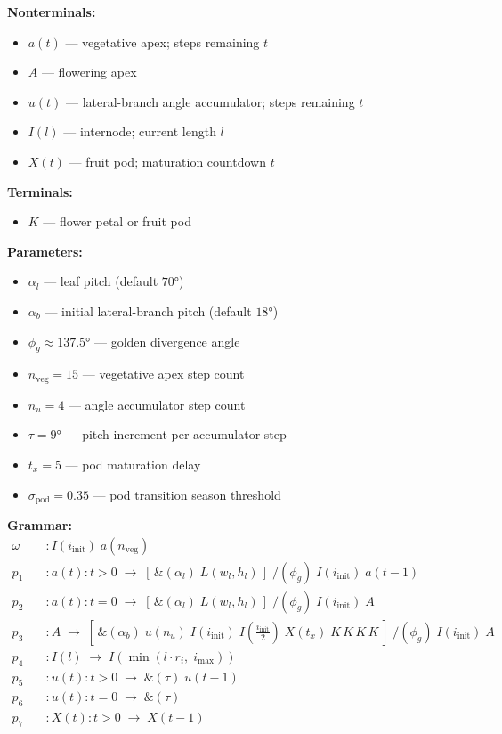 \begin{appendices}
\textbf{Nonterminals:}
\begin{itemize}
  \item $a(t)$ --- vegetative apex; steps remaining $t$
  \item $A$ --- flowering apex
  \item $u(t)$ --- lateral-branch angle accumulator; steps remaining $t$
  \item $I(l)$ --- internode; current length $l$
  \item $X(t)$ --- fruit pod; maturation countdown $t$
\end{itemize}

\textbf{Terminals:}
\begin{itemize}
  \item $K$ --- flower petal or fruit pod
\end{itemize}

\textbf{Parameters:}
\begin{itemize}
  \item $\alpha_l$ --- leaf pitch (default $70°$)
  \item $\alpha_b$ --- initial lateral-branch pitch (default $18°$)
  \item $\phi_g \approx 137.5°$ --- golden divergence angle
  \item $n_{\mathrm{veg}} = 15$ --- vegetative apex step count
  \item $n_u = 4$ --- angle accumulator step count
  \item $\tau = 9°$ --- pitch increment per accumulator step
  \item $t_x = 5$ --- pod maturation delay
  \item $\sigma_{\mathrm{pod}} = 0.35$ --- pod transition season threshold
\end{itemize}

\textbf{Grammar:}
\begin{align*}
\omega \quad &: I(i_{\mathrm{init}})\; a(n_{\mathrm{veg}}) \\
p_1    \quad &: a(t): t > 0\; \rightarrow\;[\, \mathbin{\&}(\alpha_l)\; L(w_l,h_l)\, ]\; /(\phi_g)\; I(i_{\mathrm{init}})\; a(t{-}1) \\
p_2    \quad &: a(t): t = 0\; \rightarrow\;[\, \mathbin{\&}(\alpha_l)\; L(w_l,h_l)\, ]\; /(\phi_g)\; I(i_{\mathrm{init}})\; A \\
p_3    \quad &: A\; \rightarrow\;[\, \mathbin{\&}(\alpha_b)\; u(n_u)\; I(i_{\mathrm{init}})\; I\! \left(\tfrac{i_{\mathrm{init}}}{2}\right)\; X(t_x)\; K\, K\, K\, K\, ]\; /(\phi_g)\; I(i_{\mathrm{init}})\; A \\
p_4    \quad &: I(l)\; \rightarrow\;I\! \left(\min(l \cdot r_i,\; i_{\max})\right) \\
p_5    \quad &: u(t): t > 0\; \rightarrow\;\mathbin{\&}(\tau)\; u(t{-}1) \\
p_6    \quad &: u(t): t = 0\; \rightarrow\;\mathbin{\&}(\tau) \\
p_7    \quad &: X(t): t > 0\; \rightarrow\;X(t{-}1)
\end{align*}


\end{appendices}
